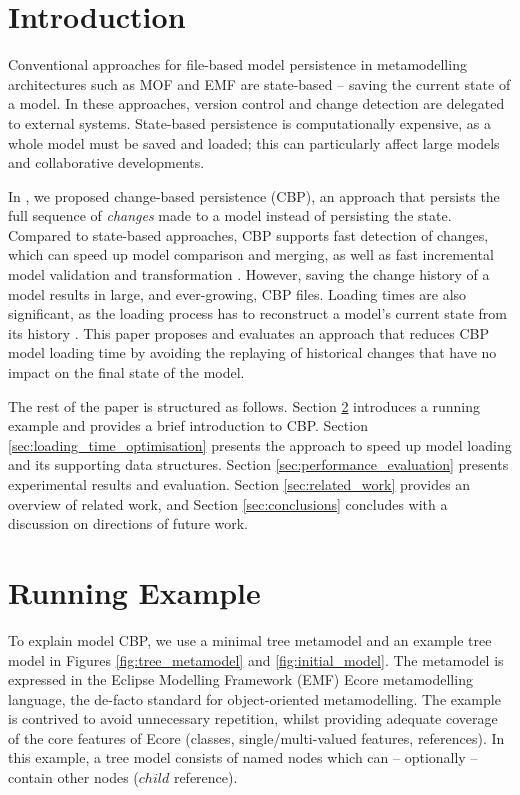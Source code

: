 \documentclass{llncs}
\begin{document}
    \section{Introduction}
    \label{sec:introduction}
    Conventional approaches for file-based model persistence in metamodelling architectures such as MOF \cite{omg2018mof} and EMF \cite{steinberg2008emf} are state-based -- saving the current state of a model.  In these approaches,  version control and change detection are delegated to external systems.  State-based persistence is computationally expensive, as a whole model must be saved and loaded; this can particularly affect large models and collaborative developments.
    
    In \cite{yohannis2017turning}, we proposed change-based persistence (CBP), an approach that persists the full sequence of \emph{changes} made to a model instead of persisting the state. Compared to state-based approaches, CBP supports fast detection of changes, which can speed up model comparison and merging, as well as fast incremental model validation and transformation \cite{rath2012derived,ogunyomi2015property}. However, saving the change history of a model results in large, and ever-growing, CBP files.  Loading times are also significant, as the loading process has to reconstruct a model's current state from its history \cite{yohannis2017turning}. This paper proposes and evaluates an approach that reduces CBP model loading time by avoiding the replaying of historical changes that have no impact on the final state of the model.
    
    The rest of the paper is structured as follows. Section \ref{sec:case_study} introduces a running example and provides a brief introduction to CBP.
    Section \ref{sec:loading_time_optimisation} presents the approach to speed up model loading and its supporting data structures. Section \ref{sec:performance_evaluation} presents experimental results and evaluation. Section \ref{sec:related_work} provides an overview of related work, and Section \ref{sec:conclusions} concludes with a discussion on directions of future work.
    
    \vspace{-15pt}
    \section{Running Example}
    \label{sec:case_study}
    \vspace{-10pt}
    To explain model CBP, we use a minimal tree metamodel and an example tree model in Figures \ref{fig:tree_metamodel} and \ref{fig:initial_model}.
    The metamodel is expressed in the Eclipse Modelling Framework (EMF) Ecore metamodelling language, the de-facto standard for object-oriented metamodelling.  The example is contrived to avoid unnecessary repetition, whilst providing adequate coverage of the core features of Ecore (classes, single/multi-valued features, references).
    In this example, a tree model consists of named nodes which can -- optionally -- contain other nodes ($child$ reference).
    
\end{document}
